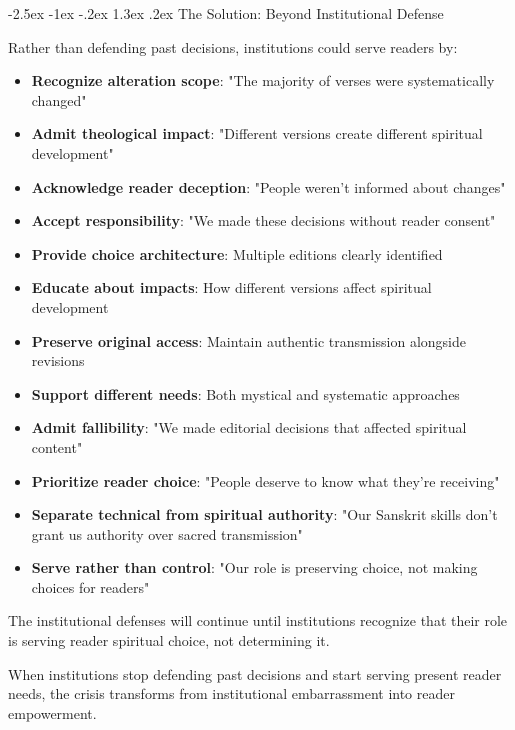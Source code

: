 \documentclass[12pt,twoside]{book}
\makeatletter
\renewcommand\section{\@startsection{section}{1}{\z@}%
{-2.5ex \@plus -1ex \@minus -.2ex}%
{1.3ex \@plus.2ex}%
{\normalfont\Large\bfseries}}
\makeatother
\begin{document}
\section{The Solution: Beyond Institutional Defense}
\label{sec:org1571763}

Rather than defending past decisions, institutions could serve readers by:

\begin{itemize}
\item \textbf{\textbf{Recognize alteration scope}}: "The majority of verses were systematically changed"
\item \textbf{\textbf{Admit theological impact}}: "Different versions create different spiritual development"
\item \textbf{\textbf{Acknowledge reader deception}}: "People weren't informed about changes"
\item \textbf{\textbf{Accept responsibility}}: "We made these decisions without reader consent"

\item \textbf{\textbf{Provide choice architecture}}: Multiple editions clearly identified
\item \textbf{\textbf{Educate about impacts}}: How different versions affect spiritual development
\item \textbf{\textbf{Preserve original access}}: Maintain authentic transmission alongside revisions
\item \textbf{\textbf{Support different needs}}: Both mystical and systematic approaches

\item \textbf{\textbf{Admit fallibility}}: "We made editorial decisions that affected spiritual content"
\item \textbf{\textbf{Prioritize reader choice}}: "People deserve to know what they're receiving"
\item \textbf{\textbf{Separate technical from spiritual authority}}: "Our Sanskrit skills don't grant us authority over sacred transmission"
\item \textbf{\textbf{Serve rather than control}}: "Our role is preserving choice, not making choices for readers"
\end{itemize}

The institutional defenses will continue until institutions recognize that their role is serving reader spiritual choice, not determining it.

When institutions stop defending past decisions and start serving present reader needs, the crisis transforms from institutional embarrassment into reader empowerment.
\end{document}
